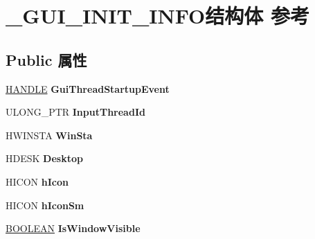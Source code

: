 \hypertarget{struct___g_u_i___i_n_i_t___i_n_f_o}{}\section{\+\_\+\+G\+U\+I\+\_\+\+I\+N\+I\+T\+\_\+\+I\+N\+F\+O结构体 参考}
\label{struct___g_u_i___i_n_i_t___i_n_f_o}
\subsection*{Public 属性}
\begin{DoxyCompactItemize}
\item 
\mbox{\label{struct___g_u_i___i_n_i_t___i_n_f_o_aaaf1c0641c2ab7e6f471e156017fbc5a}} 
\hyperlink{interfacevoid}{H\+A\+N\+D\+LE} {\bfseries Gui\+Thread\+Startup\+Event}
\item 
\mbox{\label{struct___g_u_i___i_n_i_t___i_n_f_o_a6d8e7491ca5c79b4046e9f8238953d1e}} 
U\+L\+O\+N\+G\+\_\+\+P\+TR {\bfseries Input\+Thread\+Id}
\item 
\mbox{\label{struct___g_u_i___i_n_i_t___i_n_f_o_ade8bad571682e2d721d6b61d881e8e59}} 
H\+W\+I\+N\+S\+TA {\bfseries Win\+Sta}
\item 
\mbox{\label{struct___g_u_i___i_n_i_t___i_n_f_o_a2dcfd86175dd0fdb5ef1308123e51bf8}} 
H\+D\+E\+SK {\bfseries Desktop}
\item 
\mbox{\label{struct___g_u_i___i_n_i_t___i_n_f_o_a306317271767558c3543c0c1bed36858}} 
H\+I\+C\+ON {\bfseries h\+Icon}
\item 
\mbox{\label{struct___g_u_i___i_n_i_t___i_n_f_o_ab28bb00f4ad89dea84b380287edafc7a}} 
H\+I\+C\+ON {\bfseries h\+Icon\+Sm}
\item 
\mbox{\label{struct___g_u_i___i_n_i_t___i_n_f_o_ad5109c3b01c73ec2e025239d5e883685}} 
\hyperlink{_processor_bind_8h_a112e3146cb38b6ee95e64d85842e380a}{B\+O\+O\+L\+E\+AN} {\bfseries Is\+Window\+Visible}
\item 

\end{DoxyCompactItemize}
